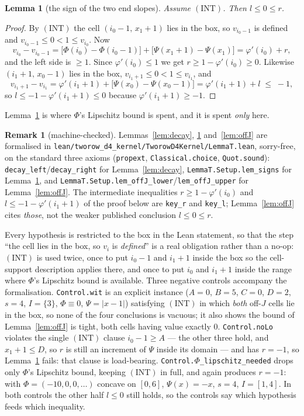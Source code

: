 \documentclass[11pt]{article}
\newtheorem{lemma}[theorem]{Lemma}
\theoremstyle{definition}
\newtheorem{remark}[theorem]{Remark}
\newcommand{\INT}{(\mathrm{INT})}
\begin{document}
\begin{lemma}[the sign of the two end slopes]\label{lem:signs}
Assume $\INT$. Then $l\le 0\le r$.
\end{lemma}
\begin{proof}
By $\INT$ the cell $(i_0-1,\,x_1+1)$ lies in the box, so $v_{i_0-1}$ is defined and
$v_{i_0-1}\le0<1\le v_{i_0}$. Now
\[
  v_{i_0}-v_{i_0-1}
  =\bigl[\Phi(i_0)-\Phi(i_0-1)\bigr]+\bigl[\Psi(x_1+1)-\Psi(x_1)\bigr]
  =\varphi'(i_0)+r ,
\]
and the left side is $\ge1$. Since $\varphi'(i_0)\le1$ we get $r\ge1-\varphi'(i_0)\ge0$.
Likewise $(i_1+1,\,x_0-1)$ lies in the box, $v_{i_1+1}\le0<1\le v_{i_1}$, and
\[
  v_{i_1+1}-v_{i_1}=\varphi'(i_1+1)+\bigl[\Psi(x_0)-\Psi(x_0-1)\bigr]=\varphi'(i_1+1)+l
  \;\le\;-1 ,
\]
so $l\le-1-\varphi'(i_1+1)\le0$ because $\varphi'(i_1+1)\ge-1$.
\end{proof}

Lemma~\ref{lem:signs} is where $\Phi$'s Lipschitz bound is spent, and it is spent
\emph{only} here.

\begin{remark}[machine-checked]\label{rem:leanT}
Lemmas~\ref{lem:decay}, \ref{lem:signs} and~\ref{lem:offJ} are formalised in
\verb|lean/tworow_d4_kernel/TworowD4Kernel/LemmaT.lean|, sorry-free, on the standard three
axioms (\verb|propext|, \verb|Classical.choice|, \verb|Quot.sound|):
\verb|decay_left|/\verb|decay_right| for Lemma~\ref{lem:decay},
\verb|LemmaT.Setup.lem_signs| for Lemma~\ref{lem:signs}, and
\verb|LemmaT.Setup.lem_offJ_lower|/\verb|lem_offJ_upper| for Lemma~\ref{lem:offJ}. The
intermediate inequalities $r\ge1-\varphi'(i_0)$ and $l\le-1-\varphi'(i_1+1)$ of the proof
below are \verb|key_r| and \verb|key_l|; Lemma~\ref{lem:offJ} cites \emph{those}, not the
weaker published conclusion $l\le0\le r$.

Every hypothesis is restricted to the box in the Lean statement, so that the step ``the
cell lies in the box, so $v_{i}$ is \emph{defined}'' is a real obligation rather than a
no-op: $\INT$ is used twice, once to put $i_0-1$ and $i_1+1$ inside the box so the
cell-support description applies there, and once to put $i_0$ and $i_1+1$ inside the range
where $\Phi$'s Lipschitz bound is available. Three negative controls accompany the
formalisation. \verb|Control.wit| is an explicit instance ($A=0$, $B=5$, $C=0$, $D=2$,
$s=4$, $I=\{3\}$, $\Phi\equiv0$, $\Psi=|x-1|$) satisfying $\INT$ in which \emph{both}
off-$J$ cells lie in the box, so none of the four conclusions is vacuous; it also shows the
bound of Lemma~\ref{lem:offJ} is tight, both cells having value exactly $0$.
\verb|Control.noLo| violates the single $\INT$ clause $i_0-1\ge A$ --- the other three hold,
and $x_1+1\le D$, so $r$ is still an increment of $\Psi$ inside its domain --- and has
$r=-1$, so Lemma~\ref{lem:signs} fails: that clause is load-bearing.
\verb|Control.|$\Phi$\verb|_lipschitz_needed| drops only $\Phi$'s Lipschitz bound, keeping
$\INT$ in full, and again produces $r=-1$: with $\Phi=(-10,0,0,\dots)$ concave on $[0,6]$,
$\Psi(x)=-x$, $s=4$, $I=[1,4]$. In both controls the other half $l\le0$ still holds, so the
controls say which hypothesis feeds which inequality.
\end{remark}
\end{document}

